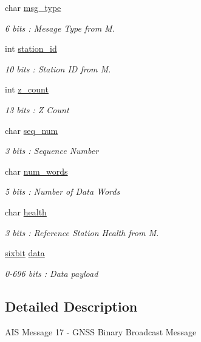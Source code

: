 \begin{DoxyCompactItemize}
char \mbox{\hyperlink{structaismsg__17_aae1c0f82df9d72e5618b09c4a0ca2420}{msg\+\_\+type}}
\begin{DoxyCompactList}\small\item\em 6 bits \+: Mesage Type from M. \end{DoxyCompactList}\item 
int \mbox{\hyperlink{structaismsg__17_a550ec42bc073903d5a4b07b9f4570b3a}{station\+\_\+id}}
\begin{DoxyCompactList}\small\item\em 10 bits \+: Station ID from M. \end{DoxyCompactList}\item 
int \mbox{\hyperlink{structaismsg__17_ac17316cf543595f13a57ed69a5d7f755}{z\+\_\+count}}
\begin{DoxyCompactList}\small\item\em 13 bits \+: Z Count \end{DoxyCompactList}\item 
char \mbox{\hyperlink{structaismsg__17_ac8a3a36ccd85fa1da4d4c0ded928a140}{seq\+\_\+num}}
\begin{DoxyCompactList}\small\item\em 3 bits \+: Sequence Number \end{DoxyCompactList}\item 
char \mbox{\hyperlink{structaismsg__17_a6e563d70627a2810b607c8c8a4ece22d}{num\+\_\+words}}
\begin{DoxyCompactList}\small\item\em 5 bits \+: Number of Data Words \end{DoxyCompactList}\item 
char \mbox{\hyperlink{structaismsg__17_a44ecea7299eee0da802cab93e6ae6d20}{health}}
\begin{DoxyCompactList}\small\item\em 3 bits \+: Reference Station Health from M. \end{DoxyCompactList}\item 
\mbox{\hyperlink{structsixbit}{sixbit}} \mbox{\hyperlink{structaismsg__17_ac9a97be376f6d2ba511e35c77eb86e7c}{data}}
\begin{DoxyCompactList}\small\item\em 0-\/696 bits \+: Data payload \end{DoxyCompactList}\end{DoxyCompactItemize}


\subsection{Detailed Description}
A\+IS Message 17 -\/ G\+N\+SS Binary Broadcast Message 

